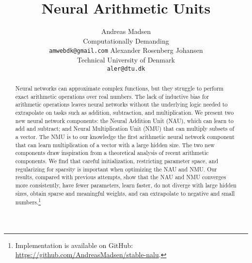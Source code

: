 \documentclass{article}
\title{Neural Arithmetic Units}
\author{%
  Andreas Madsen \\
  Computationally Demanding \\
  \texttt{amwebdk@gmail.com}
  \And
  Alexander Rosenberg Johansen \\
  Technical University of Denmark \\
  \texttt{aler@dtu.dk} \\
}
\begin{document}
\maketitle

\begin{abstract}


Neural networks can approximate complex functions, but they struggle to perform exact arithmetic operations over real numbers.
The lack of inductive bias for arithmetic operations leaves neural networks without the underlying logic needed to extrapolate on tasks such as addition, subtraction, and multiplication.
We present two new neural network components: the Neural Addition Unit (NAU), which can learn to add and subtract; and Neural Multiplication Unit (NMU) that can multiply subsets of a vector.
The NMU is to our knowledge the first arithmetic neural network component that can learn multiplication of a vector with a large hidden size.
The two new components draw inspiration from a theoretical analysis of recent arithmetic components.
We find that careful initialization, restricting parameter space, and regularizing for sparsity is important when optimizing the NAU and NMU.
Our results, compared with previous attempts, show that the NAU and NMU converges more consistently, have fewer parameters, learn faster, do not diverge with large hidden sizes, obtain sparse and meaningful weights, and can extrapolate to negative and small numbers.\ifdefined\nonanonymous\footnote{Implementation is available on GitHub: \url{https://github.com/AndreasMadsen/stable-nalu}.}\fi


\end{abstract}
\end{document}
